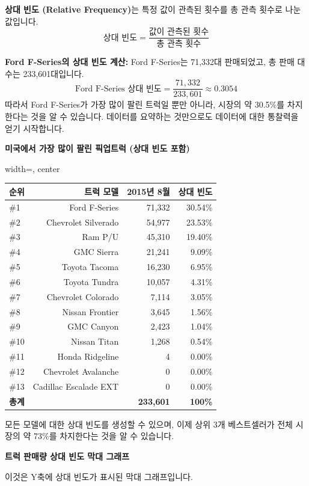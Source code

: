 \documentclass[11pt,a4paper]{book}
\providecommand{\captionof}[2]{\textbf{#2}}
\theoremstyle{definition}
\begin{document}
\begin{tcolorbox}[title={상대 빈도 분포 (Relative Frequency Distribution)}]
\textbf{상대 빈도 (Relative Frequency)}는 특정 값이 관측된 횟수를 총 관측 횟수로 나눈 값입니다.
\[ \text{상대 빈도} = \frac{\text{값이 관측된 횟수}}{\text{총 관측 횟수}} \]

\begin{examplebox}
\textbf{Ford F-Series의 상대 빈도 계산:}
Ford F-Series는 71,332대 판매되었고, 총 판매 대수는 233,601대입니다.
\[ \text{Ford F-Series 상대 빈도} = \frac{71,332}{233,601} \approx 0.3054 \]
따라서 Ford F-Series가 가장 많이 팔린 트럭일 뿐만 아니라, 시장의 약 30.5\%를 차지한다는 것을 알 수 있습니다. 데이터를 요약하는 것만으로도 데이터에 대한 통찰력을 얻기 시작합니다.
\end{examplebox}

\begin{center}
\captionof{table}{미국에서 가장 많이 팔린 픽업트럭 (상대 빈도 포함)}
\label{tab:pickup_trucks_relative_freq}
\begin{adjustbox}{width=\textwidth, center}
\begin{tabular}{lrrr}
\toprule
\textbf{순위} & \textbf{트럭 모델} & \textbf{2015년 8월} & \textbf{상대 빈도} \\
\midrule
\#1 & Ford F-Series & 71,332 & 30.54\% \\
\#2 & Chevrolet Silverado & 54,977 & 23.53\% \\
\#3 & Ram P/U & 45,310 & 19.40\% \\
\#4 & GMC Sierra & 21,241 & 9.09\% \\
\#5 & Toyota Tacoma & 16,230 & 6.95\% \\
\#6 & Toyota Tundra & 10,057 & 4.31\% \\
\#7 & Chevrolet Colorado & 7,114 & 3.05\% \\
\#8 & Nissan Frontier & 3,645 & 1.56\% \\
\#9 & GMC Canyon & 2,423 & 1.04\% \\
\#10 & Nissan Titan & 1,268 & 0.54\% \\
\#11 & Honda Ridgeline & 4 & 0.00\% \\
\#12 & Chevrolet Avalanche & 0 & 0.00\% \\
\#13 & Cadillac Escalade EXT & 0 & 0.00\% \\
\midrule
\textbf{총계} & & \textbf{233,601} & \textbf{100\%} \\
\bottomrule
\end{tabular}
\end{adjustbox}
\end{center}
모든 모델에 대한 상대 빈도를 생성할 수 있으며, 이제 상위 3개 베스트셀러가 전체 시장의 약 73\%를 차지한다는 것을 알 수 있습니다.

\begin{center}
\captionof{figure}{트럭 판매량 상대 빈도 막대 그래프}
\label{fig:bar_graph_relative_freq}
\end{center}
이것은 Y축에 상대 빈도가 표시된 막대 그래프입니다.
\end{tcolorbox}
\end{document}
